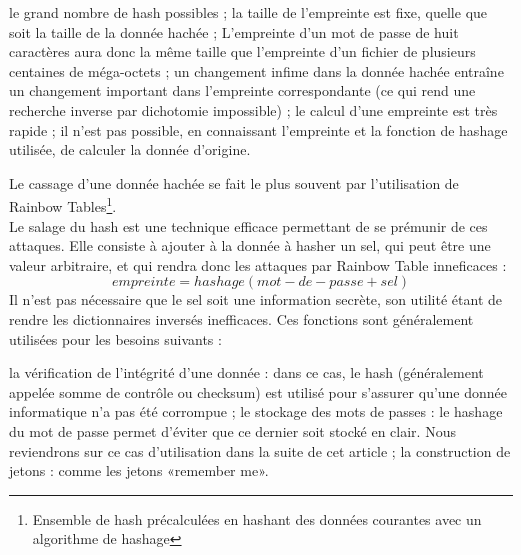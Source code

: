 \begin{itemize}
	\begin{itemize}
		\itemtirait le grand nombre de hash possibles ;
		\itemtirait la taille de l’empreinte est fixe, quelle que soit la taille de la donnée hachée ;
		\itemtirait L’empreinte d’un mot de passe de huit caractères aura donc la même taille que l’empreinte d’un fichier de plusieurs centaines de méga-octets ;
		\itemtirait un changement infime dans la donnée hachée entraîne un changement important dans l’empreinte correspondante (ce qui rend une recherche inverse par dichotomie impossible) ;
		\itemtirait le calcul d’une empreinte est très rapide ;
		\itemtirait il n’est pas possible, en connaissant l’empreinte et la fonction de hashage utilisée, de calculer la donnée d’origine.
	\end{itemize}
	Le cassage d’une donnée hachée se fait le plus souvent par l’utilisation de Rainbow Tables\footnote{Ensemble de hash précalculées en hashant des données courantes avec un algorithme de hashage}.\\
	Le salage du hash est une technique efficace permettant de se prémunir de ces attaques. Elle consiste à ajouter à la donnée à hasher un sel, qui peut être une valeur arbitraire, et qui rendra donc les attaques par Rainbow Table inneficaces : \\
	\begin{equation}
	empreinte = hashage(mot-de-passe + sel)
	\end{equation}
	Il n’est pas nécessaire que le sel soit une information secrète, son utilité étant de rendre les dictionnaires inversés inefficaces.
	Ces fonctions sont généralement utilisées pour les besoins suivants :
	\begin{itemize}
		\itemcheck la vérification de l’intégrité d’une donnée : dans ce cas, le hash (généralement appelée somme de contrôle ou checksum) est utilisé pour s’assurer qu’une donnée informatique n’a pas été corrompue ;
		\itemcheck le stockage des mots de passes : le hashage du mot de passe permet d’éviter que ce dernier soit stocké en clair. Nous reviendrons sur ce cas d’utilisation dans la suite de cet article ;
		\itemcheck la construction de jetons : comme les jetons «remember me».
	\end{itemize}
	\begin{comment}
	Il existe différents algorithmes de hashage :
	MD5 (Message Digest 5) : probablement le plus connu, il est souvent utilisé pour les sommes de contrôle ou le stockage de mot de passes (notamment dans sa version salée dans diverses distributions Linux). Son empreinte est représentée sur 128 bits. Actuellement, le MD5 est mis de côté au profit des algorithmes SHA1 et SHA256 réputés plus sûrs.

\end{comment}
\end{itemize}
